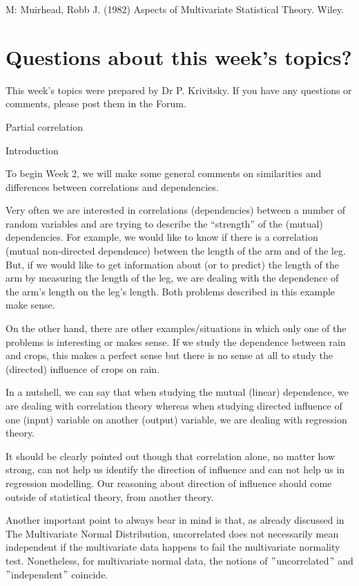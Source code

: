 \documentclass[11pt]{article}
\begin{document}
M: Muirhead, Robb J. (1982) Aspects of Multivariate Statistical Theory. Wiley.

\section{Questions about this week's topics?}\label{sec:questions-about-this-week's-topics?}

This week's topics were prepared by Dr P. Krivitsky.
If you have any questions or comments, please post them in the Forum.

Partial correlation

Introduction

To begin Week 2, we will make some general comments on similarities and
differences between correlations and dependencies.

Very often we are interested in correlations (dependencies) between a number
of random variables and are trying to describe the “strength” of the (mutual)
dependencies.
For example, we would like to know if there is a correlation (mutual
non-directed dependence) between the length of the arm and of the leg.
But, if we would like to get information about (or to predict) the length of
the arm by measuring the length of the leg, we are dealing with the dependence
of the arm’s length on the leg’s length.
Both problems described in this example make sense.

On the other hand, there are other examples/situations in which only one of
the problems is interesting or makes sense.
If we study the dependence between rain and crops, this makes a perfect sense
but there is no sense at all to study the (directed) influence of crops on
rain.

In a nutshell, we can say that when studying the mutual (linear) dependence,
we are dealing with correlation theory whereas when studying directed
influence of one (input) variable on another (output) variable, we are dealing
with regression theory.

It should be clearly pointed out though that correlation alone, no matter how
strong, can not help us identify the direction of influence and can not help
us in regression modelling.
Our reasoning about direction of influence should come outside of statistical
theory, from another theory.

Another important point to always bear in mind is that, as already discussed in
The Multivariate Normal Distribution, uncorrelated does not necessarily mean
independent if the multivariate data happens to fail the multivariate
normality test.
Nonetheless, for multivariate normal data, the notions of \("\)uncorrelated\("\)
and \("\)independent\("\) coincide.
\end{document}
